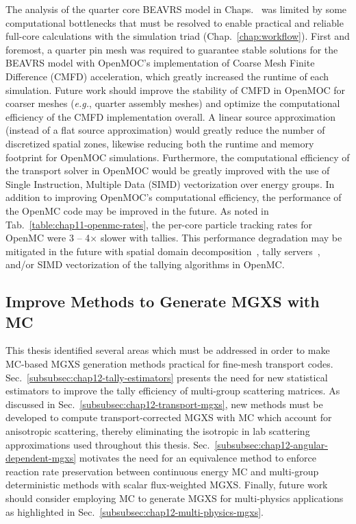 The analysis of the quarter core \ac{BEAVRS} model in Chaps.~ was limited by some computational bottlenecks that must be resolved to enable practical and reliable full-core calculations with the simulation triad (Chap.~\ref{chap:workflow}). First and foremost, a quarter pin mesh was required to guarantee stable solutions for the \ac{BEAVRS} model with OpenMOC's implementation of Coarse Mesh Finite Difference (CMFD) acceleration, which greatly increased the runtime of each simulation. Future work should improve the stability of \ac{CMFD} in OpenMOC for coarser meshes (\textit{e.g.}, quarter assembly meshes) and optimize the computational efficiency of the \ac{CMFD} implementation overall. A linear source approximation (instead of a flat source approximation) would greatly reduce the number of discretized spatial zones, likewise reducing both the runtime and memory footprint for OpenMOC simulations. Furthermore, the computational efficiency of the transport solver in OpenMOC would be greatly improved with the use of Single Instruction, Multiple Data (SIMD) vectorization over energy groups. In addition to improving OpenMOC's computational efficiency, the performance of the OpenMC code may be improved in the future. As noted in Tab.~\ref{table:chap11-openmc-rates}, the per-core particle tracking rates for OpenMC were 3 -- 4$\times$ slower with tallies. This performance degradation may be mitigated in the future with spatial domain decomposition~\cite{horelik2014dd}, tally servers~\cite{romano2013servers}, and/or SIMD vectorization of the tallying algorithms in OpenMC.

\subsection{Improve Methods to Generate MGXS with MC}
\label{subsec:chap12-improve-mc-methods}

This thesis identified several areas which must be addressed in order to make \ac{MC}-based \ac{MGXS} generation methods practical for fine-mesh transport codes. Sec.~\ref{subsubsec:chap12-tally-estimators} presents the need for new statistical estimators to improve the tally efficiency of multi-group scattering matrices. As discussed in Sec.~\ref{subsubsec:chap12-transport-mgxs}, new methods must be developed to compute transport-corrected \ac{MGXS} with \ac{MC} which account for anisotropic scattering, thereby eliminating the isotropic in lab scattering approximations used throughout this thesis. Sec.~\ref{subsubsec:chap12-angular-dependent-mgxs} motivates the need for an equivalence method to enforce reaction rate preservation between continuous energy \ac{MC} and multi-group deterministic methods with scalar flux-weighted \ac{MGXS}. Finally, future work should consider employing \ac{MC} to generate \ac{MGXS} for multi-physics applications as highlighted in Sec.~\ref{subsubsec:chap12-multi-physics-mgxs}.

